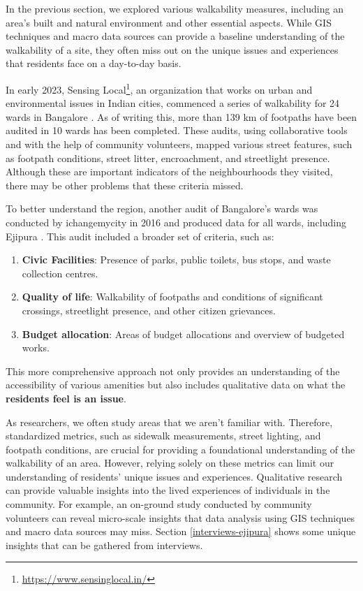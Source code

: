 \documentclass[
]{latex/krantz}
\providecommand{\tightlist}{%
  \setlength{\itemsep}{0pt}\setlength{\parskip}{0pt}}
\renewcommand{\href}[2]{#2\footnote{\url{#1}}}
\DeclareRobustCommand{\href}[2]{#2\footnote{\url{#1}}}
\begin{document}
In the previous section, we explored various walkability measures, including an area's built and natural environment and other essential aspects. While GIS techniques and macro data sources can provide a baseline understanding of the walkability of a site, they often miss out on the unique issues and experiences that residents face on a day-to-day basis.

In early 2023, \href{https://www.sensinglocal.in/}{Sensing Local}, an organization that works on urban and environmental issues in Indian cities, commenced a series of walkability for 24 wards in Bangalore \autocite{byiffathRaisingStreets2022}. As of writing this, more than 139 km of footpaths have been audited in 10 wards has been completed. These audits, using collaborative tools and with the help of community volunteers, mapped various street features, such as footpath conditions, street litter, encroachment, and streetlight presence. Although these are important indicators of the neighbourhoods they visited, there may be other problems that these criteria missed.

To better understand the region, another audit of Bangalore's wards was conducted by ichangemycity in 2016 and produced data for all wards, including Ejipura \autocite{ichangemycityEjipuraWard1482016}. This audit included a broader set of criteria, such as:

\begin{enumerate}
\def\labelenumi{\arabic{enumi}.}
\tightlist
\item
  \textbf{Civic Facilities}: Presence of parks, public toilets, bus stops, and waste collection centres.
\item
  \textbf{Quality of life}: Walkability of footpaths and conditions of significant crossings, streetlight presence, and other citizen grievances.
\item
  \textbf{Budget allocation}: Areas of budget allocations and overview of budgeted works.
\end{enumerate}

This more comprehensive approach not only provides an understanding of the accessibility of various amenities but also includes qualitative data on what the \textbf{residents feel is an issue}.

As researchers, we often study areas that we aren't familiar with. Therefore, standardized metrics, such as sidewalk measurements, street lighting, and footpath conditions, are crucial for providing a foundational understanding of the walkability of an area. However, relying solely on these metrics can limit our understanding of residents' unique issues and experiences. Qualitative research can provide valuable insights into the lived experiences of individuals in the community. For example, an on-ground study conducted by community volunteers can reveal micro-scale insights that data analysis using GIS techniques and macro data sources may miss. Section \ref{interviews-ejipura} shows some unique insights that can be gathered from interviews.
\end{document}
